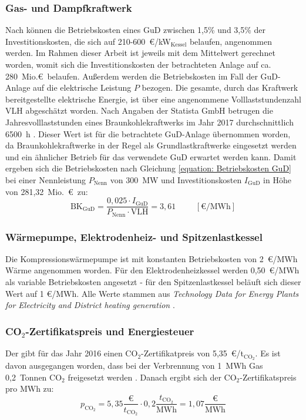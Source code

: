 \subsubsection*{Gas- und Dampfkraftwerk}
Nach \citet{Schmitz2009} können die Betriebskosten eines \ac{GuD} zwischen 1,5\% und 3,5\% der Investitionskosten, die sich auf 210-600~\euro/kW$_\text{Kessel}$ belaufen, angenommen werden. Im Rahmen dieser Arbeit ist jeweils mit dem Mittelwert gerechnet worden, womit sich die Investitionskosten der betrachteten Anlage auf ca. 280~Mio.\euro\ belaufen. Außerdem werden die Betriebskosten im Fall der \ac{GuD}-Anlage auf die elektrische Leistung $P$ bezogen. Die gesamte, durch das Kraftwerk bereitgestellte elektrische Energie, ist über eine angenommene Volllaststundenzahl VLH abgeschätzt worden. Nach Angaben der Statista GmbH betrugen die Jahresvolllaststunden eines Braunkohlekraftwerks im Jahr 2017 durchschnittlich 6500\ h \cite{statista2017}. Dieser Wert ist für die betrachtete \ac{GuD}-Anlage übernommen worden, da Braunkohlekraftwerke in der Regel als Grundlastkraftwerke eingesetzt werden und ein ähnlicher Betrieb für das verwendete \ac{GuD} erwartet werden kann. Damit ergeben sich die Betriebskosten nach Gleichung \ref{equation: Betriebskosten GuD} bei einer Nennleistung $P_\text{Nenn}$ von 300~MW und Investitionskosten $I_\text{GuD}$ in Höhe von 281,32~Mio.~\euro\  zu:
	\begin{equation}
		\label{equation: Betriebskosten GuD}
		\text{BK}_\text{GuD} = \dfrac{0,025 \cdot I_\text{GuD}}{P_\text{Nenn} \cdot \text{VLH}} = 3,61 \hspace{1cm} [\euro/\text{MWh}]
	\end{equation}

\subsubsection*{Wärmepumpe, Elektrodenheiz- und Spitzenlastkessel}
Die Kompressionswärmepumpe ist mit konstanten Betriebskosten von 2~\euro/MWh Wärme angenommen worden. Für den Elektrodenheizkessel werden 0,50~\euro/MWh als variable Betriebskosten angesetzt - für den Spitzenlastkessel beläuft sich dieser Wert auf 1 \euro/MWh. Alle Werte stammen aus \textit{Technology Data for Energy Plants for Electricity and District heating generation} \cite{Energinet}.

\subsubsection*{CO$_2$-Zertifikatspreis und Energiesteuer}
Der \citet{BDEW} gibt für das Jahr 2016 einen CO$_2$-Zertifikatpreis von 5,35~\euro/t$_{\text{CO}_2}$. Es ist davon ausgegangen worden, dass bei der Verbrennung von 1~MWh Gas 0,2~Tonnen ${\text{CO}_2}$ freigesetzt werden \cite{Quaschning2015}. Danach ergibt sich der CO$_2$-Zertifikatspreis pro MWh zu:
	\begin{equation*}
		p_{\text{CO}_2} = 5,35 \frac{\euro}{t_{\text{CO}_2}} \cdot 0,2 \dfrac{t_{\text{CO}_2}}{\text{MWh}} = 1,07 \frac{\euro}{\text{MWh}}
	\end{equation*}

